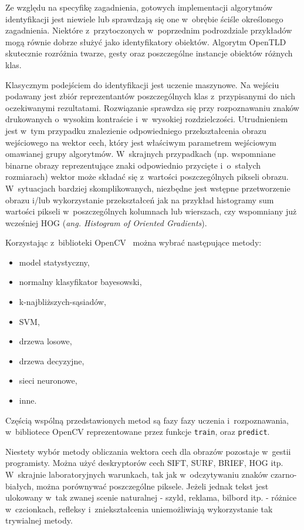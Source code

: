 Ze względu na specyfikę zagadnienia, gotowych implementacji algorytmów
identyfikacji jest niewiele lub sprawdzają się one w~obrębie
ściśle określonego zagadnienia. Niektóre z~przytoczonych w~poprzednim
podrozdziale przykładów mogą równie dobrze służyć jako identyfikatory
obiektów. Algorytm OpenTLD skutecznie rozróżnia twarze, gesty oraz
poszczególne instancje obiektów różnych klas.

Klasycznym podejściem do identyfikacji jest uczenie maszynowe. Na
wejściu podawany jest zbiór reprezentantów poszczególnych klas
z~przypisanymi do nich oczekiwanymi rezultatami. Rozwiązanie
sprawdza się przy rozpoznawaniu znaków drukowanych o~wysokim
kontraście i~w~wysokiej rozdzielczości. Utrudnieniem jest w~tym
przypadku znalezienie odpowiedniego przekształcenia obrazu
wejściowego na wektor cech, który jest właściwym 
parametrem wejściowym omawianej grupy algorytmów. W~skrajnych przypadkach
(np. wspomniane binarne obrazy reprezentujące znaki odpowiednio 
przycięte i~o~stałych rozmiarach) wektor może składać się 
z~wartości poszczególnych pikseli obrazu. W~sytuacjach bardziej 
skomplikowanych, niezbędne jest wstępne przetworzenie obrazu i/lub 
wykorzystanie przekształceń jak na przykład histogramy sum wartości
pikseli w~poszczególnych kolumnach lub wierszach, czy wspomniany
już wcześniej HOG (\textit{ang. Histogram of Oriented Gradients}).

Korzystając z~biblioteki
OpenCV \ można wybrać następujące metody:

\begin{itemize}
    \item model statystyczny,
    \item normalny klasyfikator bayesowski,
    \item k-najbliższych-sąsiadów,
    \item SVM,
    \item drzewa losowe,
    \item drzewa decyzyjne,
    \item sieci neuronowe,
    \item inne.
\end{itemize}

Częścią wspólną przedstawionych metod są fazy
fazy uczenia i~rozpoznawania, w~bibliotece
OpenCV reprezentowane przez funkcje \verb|train|, oraz \verb|predict|.

Niestety wybór metody obliczania wektora cech dla obrazów
pozostaje w~gestii programisty.
Można użyć deskryptorów cech
SIFT, SURF, BRIEF, HOG itp. W~skrajnie laboratoryjnych warunkach, tak
jak w~odczytywaniu znaków czarno-białych, można porównywać poszczególne
piksele. Jeżeli jednak tekst
jest ulokowany w~tak zwanej scenie naturalnej -
szyld, reklama, bilbord itp. - różnice w~czcionkach, refleksy
i~zniekształcenia uniemożliwiają wykorzystanie tak trywialnej metody.

